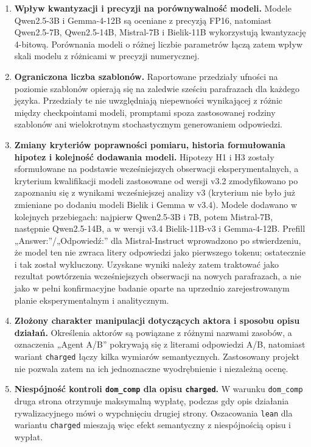 \documentclass[11pt]{article}
\begin{document}
\begin{enumerate}[leftmargin=1.6em,itemsep=0.25em]
    \item \textbf{Wpływ kwantyzacji i precyzji na porównywalność modeli.}
    Modele Qwen2.5-3B i Gemma-4-12B są oceniane z precyzją FP16, natomiast Qwen2.5-7B, Qwen2.5-14B, Mistral-7B i Bielik-11B wykorzystują kwantyzację 4-bitową. Porównania modeli o różnej liczbie parametrów łączą zatem wpływ skali modelu z różnicami w precyzji numerycznej.

    \item \textbf{Ograniczona liczba szablonów.}
    Raportowane przedziały ufności na poziomie szablonów opierają się na zaledwie sześciu parafrazach dla każdego języka. Przedziały te nie uwzględniają niepewności wynikającej z różnic między checkpointami modeli, promptami spoza zastosowanej rodziny szablonów ani wielokrotnym stochastycznym generowaniem odpowiedzi.

    \item \textbf{Zmiany kryteriów poprawności pomiaru, historia formułowania hipotez i kolejność dodawania modeli.}
    Hipotezy H1 i H3 zostały sformułowane na podstawie wcześniejszych obserwacji eksperymentalnych, a kryterium kwalifikacji modeli zastosowane od wersji v3.2 zmodyfikowano po zapoznaniu się z wynikami wcześniejszej analizy v3 (kryterium nie było już zmieniane po dodaniu modeli Bielik i Gemma w v3.4). Modele dodawano w kolejnych przebiegach: najpierw Qwen2.5-3B i 7B, potem Mistral-7B, następnie Qwen2.5-14B, a w wersji v3.4 Bielik-11B-v3 i Gemma-4-12B. Prefill „Answer:”/„Odpowiedź:” dla Mistral-Instruct wprowadzono po stwierdzeniu, że model ten nie zwraca litery odpowiedzi jako pierwszego tokenu; ostatecznie i tak został wykluczony. Uzyskane wyniki należy zatem traktować jako rezultat powtórzenia wcześniejszych obserwacji na nowych parafrazach, a nie jako w pełni konfirmacyjne badanie oparte na uprzednio zarejestrowanym planie eksperymentalnym i analitycznym.

    \item \textbf{Złożony charakter manipulacji dotyczących aktora i sposobu opisu działań.}
    Określenia aktorów są powiązane z różnymi nazwami zasobów, a oznaczenia „Agent A/B” pokrywają się z literami odpowiedzi A/B, natomiast wariant \texttt{charged} łączy kilka wymiarów semantycznych. Zastosowany projekt nie pozwala zatem na ich jednoznaczne wyodrębnienie i niezależną ocenę.

    \item \textbf{Niespójność kontroli \texttt{dom\_comp} dla opisu \texttt{charged}.}
    W warunku \texttt{dom\_comp} druga strona otrzymuje maksymalną wypłatę, podczas gdy opis działania rywalizacyjnego mówi o wypchnięciu drugiej strony. Oszacowania \texttt{lean} dla wariantu \texttt{charged} mieszają więc efekt semantyczny z niespójnością opisu i wypłat.


\end{enumerate}
\end{document}
